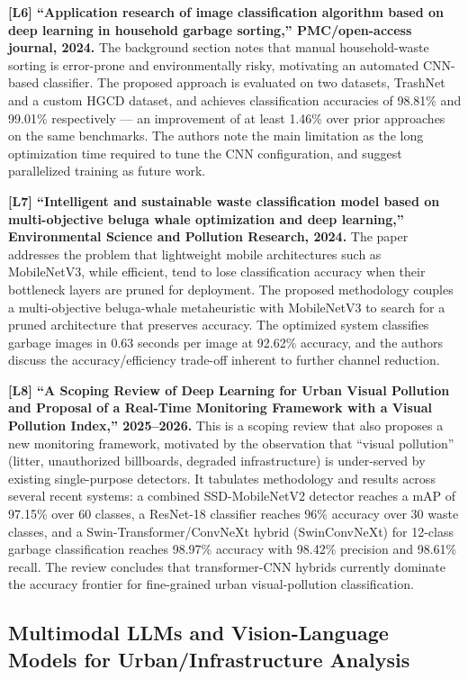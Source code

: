 \documentclass[conference]{IEEEtran}
\begin{document}
\textbf{[L6] ``Application research of image classification algorithm based on deep learning in household garbage sorting,'' PMC/open-access journal, 2024.} The background section notes that manual household-waste sorting is error-prone and environmentally risky, motivating an automated CNN-based classifier. The proposed approach is evaluated on two datasets, TrashNet and a custom HGCD dataset, and achieves classification accuracies of 98.81\% and 99.01\% respectively --- an improvement of at least 1.46\% over prior approaches on the same benchmarks. The authors note the main limitation as the long optimization time required to tune the CNN configuration, and suggest parallelized training as future work.

\textbf{[L7] ``Intelligent and sustainable waste classification model based on multi-objective beluga whale optimization and deep learning,'' Environmental Science and Pollution Research, 2024.} The paper addresses the problem that lightweight mobile architectures such as MobileNetV3, while efficient, tend to lose classification accuracy when their bottleneck layers are pruned for deployment. The proposed methodology couples a multi-objective beluga-whale metaheuristic with MobileNetV3 to search for a pruned architecture that preserves accuracy. The optimized system classifies garbage images in 0.63 seconds per image at 92.62\% accuracy, and the authors discuss the accuracy/efficiency trade-off inherent to further channel reduction.

\textbf{[L8] ``A Scoping Review of Deep Learning for Urban Visual Pollution and Proposal of a Real-Time Monitoring Framework with a Visual Pollution Index,'' 2025--2026.} This is a scoping review that also proposes a new monitoring framework, motivated by the observation that ``visual pollution'' (litter, unauthorized billboards, degraded infrastructure) is under-served by existing single-purpose detectors. It tabulates methodology and results across several recent systems: a combined SSD-MobileNetV2 detector reaches a mAP of 97.15\% over 60 classes, a ResNet-18 classifier reaches 96\% accuracy over 30 waste classes, and a Swin-Transformer/ConvNeXt hybrid (SwinConvNeXt) for 12-class garbage classification reaches 98.97\% accuracy with 98.42\% precision and 98.61\% recall. The review concludes that transformer-CNN hybrids currently dominate the accuracy frontier for fine-grained urban visual-pollution classification.

\subsection{Multimodal LLMs and Vision-Language Models for Urban/Infrastructure Analysis}
\end{document}
